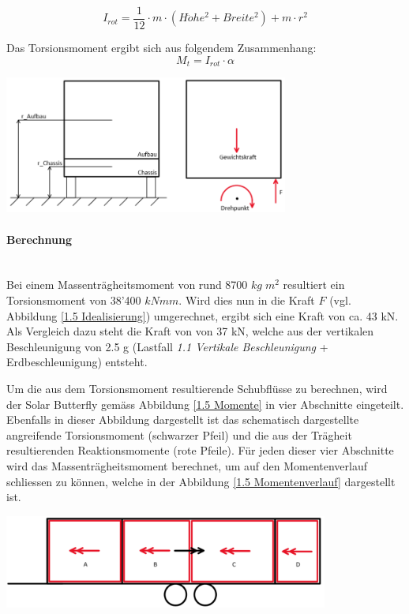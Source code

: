 \begin{equation}
  I_{rot} = \frac{1}{12} \cdot m \cdot \left(H\ddot{o}he^2 + Breite^2\right) + m \cdot r^2
\end{equation}

Das Torsionsmoment ergibt sich aus folgendem Zusammenhang:
\begin{equation}
  M_t = I_{rot} \cdot \alpha
\end{equation}

\begin{center}
  \includegraphics[width=0.7\textwidth]{04_Figures/1.5 Idealisierung.png}
  \label{1.5 Idealisierung}
\end{center}

\paragraph{Berechnung}\mbox{}\\
Bei einem Massenträgheitsmoment von rund 8700 $kg\;m^2$ resultiert ein Torsionsmoment von 38'400 $kNmm$. Wird dies nun in die Kraft $F$ (vgl. Abbildung \ref{1.5 Idealisierung}) umgerechnet, ergibt sich eine Kraft von ca. 43 kN. Als Vergleich dazu steht die Kraft von von 37 kN, welche aus der vertikalen Beschleunigung von 2.5 g (Lastfall \emph{1.1 Vertikale Beschleunigung} + Erdbeschleunigung) entsteht.

Um die aus dem Torsionsmoment resultierende Schubflüsse zu berechnen, wird der Solar Butterfly gemäss Abbildung \ref{1.5 Momente} in vier Abschnitte eingeteilt. Ebenfalls in dieser Abbildung dargestellt ist das schematisch dargestellte angreifende Torsionsmoment (schwarzer Pfeil) und die aus der Trägheit resultierenden Reaktionsmomente (rote Pfeile). Für jeden dieser vier Abschnitte wird das Massenträgheitsmoment berechnet, um auf den Momentenverlauf schliessen zu können, welche in der Abbildung \ref{1.5 Momentenverlauf} dargestellt ist.

\begin{center}
  \includegraphics[width=0.8\textwidth]{04_Figures/1.5 Momente.png}
  \label{1.5 Momente}
\end{center}

